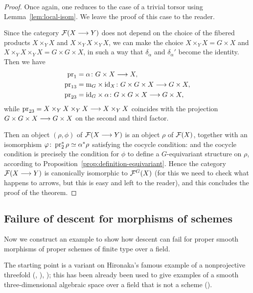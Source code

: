 \begin{4   STACKS}
\begin{4.4 Descent along torsors}
\begin{proof}
Once again, one reduces to the case of a trivial torsor using Lemma~\ref{lem:local-isom}. We leave the proof of this case to the reader.

Since the category $\mathcal{F}(X \longrightarrow Y)$ does not depend on the choice of the fibered products $X \times_{Y} X$ and $X \times_{Y} X \times_{Y} X$, we can make the choice $X \times_{Y} X = G\times X$ and $X \times_{Y} X \times_{Y} X = G \times G \times X$, in such a way that $\delta_{\alpha}$ and $\delta_{\alpha}'$ become the identity. Then we have
   \begin{align*}
   \pr_{1} &= \alpha \colon G \times X \arr X,\\
   \pr_{13}&= \mul_{G} \times \id_{X} \colon
      G \times G \times X \arr G \times X,\\
   \pr_{23}&= \id_{G} \times \alpha \colon
      G \times G \times X \arr G \times X,
   \end{align*}
while $\pr_{23}= X \times_{Y} X \times_{Y} X \arr X \times_{Y} X$ coincides with the projection $G \times G \times X \arr G \times X$ on the second and third factor.

Then an object $(\rho, \phi)$ of $\mathcal{F}(X \longrightarrow Y)$ is an object $\rho$ of $\mathcal{F}(X)$, together with an isomorphism $\varphi\colon \operatorname{pr}_{2}^{*}\rho \simeq \alpha^{*}\rho$ satisfying the cocycle condition: and the cocycle condition is precisely the condition for $\phi$ to define a $G$-equivariant structure on $\rho$, according to Proposition~\ref{prop:definition-equivariant}. Hence the category $\mathcal{F}(X\longrightarrow Y)$ is canonically isomorphic to $\mathcal{F}^{G}(X)$ (for this we need to check what happens to arrows, but this is easy and left to the reader), and this concludes the proof of the theorem.
\end{proof}


\subsection{Failure of descent for morphisms of schemes}
\label{subsec:failure}

Now we construct an example to show how descent can fail for proper smooth
morphisms of proper schemes of finite type over a field.

The starting point is a variant on Hironaka's famous example of a nonprojective threefold (\cite{hironaka62}, \cite[Chapter~3, \S~3]{git}), \cite[Appendix~B, Example~3.4.1]{hartshorne}); this has been already been used to give examples of a smooth three-dimensional algebraic space over a field that is not a scheme (\cite[p.~14]{knutson}).


\end{4.4 Descent along torsors}
\end{4   STACKS}
